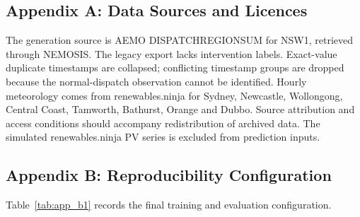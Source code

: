 \subsection*{Appendix A: Data Sources and Licences}

The generation source is AEMO DISPATCHREGIONSUM for NSW1, retrieved through NEMOSIS. The legacy export lacks intervention labels. Exact-value duplicate timestamps are collapsed; conflicting timestamp groups are dropped because the normal-dispatch observation cannot be identified. Hourly meteorology comes from renewables.ninja for Sydney, Newcastle, Wollongong, Central Coast, Tamworth, Bathurst, Orange and Dubbo. Source attribution and access conditions should accompany redistribution of archived data. The simulated renewables.ninja PV series is excluded from prediction inputs.

\subsection*{Appendix B: Reproducibility Configuration}

\setcounter{table}{0}
\renewcommand{\thetable}{B.\arabic{table}}

Table~\ref{tab:app_b1} records the final training and evaluation configuration.

